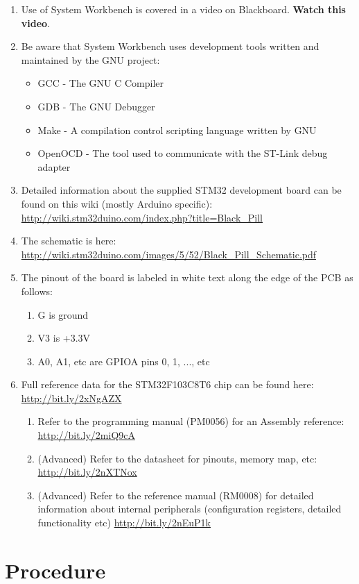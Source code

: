 \documentclass{UoNMCHA}
\numberwithin{equation}{section}
\begin{document}
\begin{enumerate}
    \item Use of System Workbench is covered in a video on Blackboard. \textbf{Watch this video}.
    \item Be aware that System Workbench uses development tools written and maintained by the GNU project:
    \begin{itemize}
        \item GCC - The GNU C Compiler
        \item GDB - The GNU Debugger
        \item Make - A compilation control scripting language written by GNU
        \item OpenOCD - The tool used to communicate with the ST-Link debug adapter
    \end{itemize}
    \item Detailed information about the supplied STM32 development board can be found on this wiki (mostly Arduino specific): \url{http://wiki.stm32duino.com/index.php?title=Black_Pill}
    \item The schematic is here: \url{http://wiki.stm32duino.com/images/5/52/Black_Pill_Schematic.pdf}
    \item The pinout of the board is labeled in white text along the edge of the PCB as follows:
    \begin{enumerate}
        \item G is ground
        \item V3 is +3.3V
        \item A0, A1, etc are GPIOA pins 0, 1, ..., etc
    \end{enumerate}
    \item Full reference data for the STM32F103C8T6 chip can be found here: \url{http://bit.ly/2xNgAZX}
    \begin{enumerate}
        \item Refer to the programming manual (PM0056) for an Assembly reference: \url{http://bit.ly/2miQ9cA}
        \item (Advanced) Refer to the datasheet for pinouts, memory map, etc: \url{http://bit.ly/2nXTNox}
        \item (Advanced) Refer to the reference manual (RM0008) for detailed information about internal peripherals (configuration registers, detailed functionality etc) \url{http://bit.ly/2nEuP1k}
    \end{enumerate}
\end{enumerate}
\section{Procedure}
\end{document}
